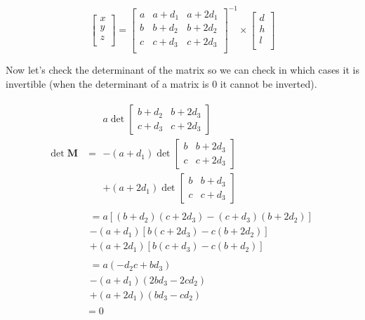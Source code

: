 \documentclass[12pt]{article}
\begin{document}
	 	\begin{equation}
	 	\left [ \begin{array}{c}
	 		x \\
	 		y \\
	 		z \\
	 	\end{array}\right ] = 
	 	\left [ \begin{array}{ccc} 
	 		a & a + d_1 & a + 2d_1 \\
	 		b & b + d_2 & b + 2d_2 \\
	 		c & c + d_3 & c + 2d_3 \\
	 	\end{array} \right ]^{-1} \times	
	 	\left [ \begin{array}{c}
	 		d \\
	 		h \\
	 		l \\
	 	\end{array}\right ]
	 \end{equation}
	
	Now let's check the determinant of the matrix so we can check in which cases it is invertible (when the determinant of a matrix is 0 it cannot be inverted).
	
	\begin{align}
		\det \bm{M} &= 
		 \begin{aligned}
				a  \det \left [ \begin{array}{cc} 
				b + d_2 & b + 2d_3 \\
				c + d_3 & c + 2d_3 \end{array} \right ] \\
			- (a+d_1) \det \left [ \begin{array}{cc} 
			b  & b + 2d_3 \\
			c & c + 2d_3 \end{array} \right ] \\
			+ (a + 2d_1) \det \left [ \begin{array}{cc} 
			b  & b + d_3 \\
			c & c + d_3
		\end{array} \right ] 
		\end{aligned} \\
	 	&\begin{aligned}
			= a [(b+d_2)(c+2d_3) - (c+d_3)(b+2d_2)] \\
			- (a+d_1)[b(c+2d_3) - c(b+2d_2)]\\
			 + (a+2d_1)[b(c+d_3) - c(b+d_2)]	
		\end{aligned} \\
		&\begin{aligned}
			= a(-d_2c+bd_3) \\ - (a+d_1)(2bd_3-2cd_2) \\ + (a+2d_1)(bd_3-cd_2)
		\end{aligned}		 \\
		 &= 0
	\end{align}
\end{document}
